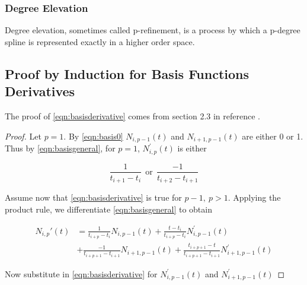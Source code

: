 \subsubsection{Degree Elevation}
Degree elevation, sometimes called p-refinement, is a process by which a p-degree spline is represented exactly in a higher order space.





 
{}


\begin{appendices}
\renewcommand{\thesection}{Appendix \Alph{section}.}

\section{Proof by Induction for Basis Functions Derivatives}
\label{sec:basisderivativeproof}
The proof of \cref{eqn:basisderivative} comes from section 2.3 in reference \cite{Piegl1997The-NURBS-Book}. 

\renewcommand{\qedsymbol}{\rule{0.7em}{0.7em}}

\begin{proof}
Let \(p=1\). By \cref{eqn:basis0} \(N_{i,p-1}(t)\) and \(N_{i+1,p-1}(t)\) are either 0 or 1. Thus by \cref{eqn:basisgeneral}, for \(p=1\), \(N_{i,p}^{'}(t)\) is either 

\[ \frac{1}{ t_{i+1} - t_{i} } ~~\text{or}~~ \frac{-1}{ t_{i+2} - t_{i+1} } \]

Assume now that \cref{eqn:basisderivative} is true for \(p-1,~p>1\). Applying the product rule, we differentiate \cref{eqn:basisgeneral} to obtain

\begin{equation}
\begin{aligned}
N_{i,p}'(t) &= \frac{1}{t_{i+p} - t_i} N_{i,p-1}(t) + \frac{t-t_i}{t_{i+p}-t_i} N_{i,p-1}^{'}(t)\\
			&+ \frac{-1}{t_{i+p+1} - t_{i+1}} N_{i+1,p-1}(t) + \frac{t_{i+p+1}-t}{t_{i+p+1}-t_{i+1}}N_{i+1,p-1}^{'}(t)
\end{aligned}
\end{equation}

Now substitute in \cref{eqn:basisderivative} for \(N_{i,p-1}^{'}(t)\) and \(N_{i+1,p-1}^{'}(t)\)


\end{proof}
\end{appendices}
